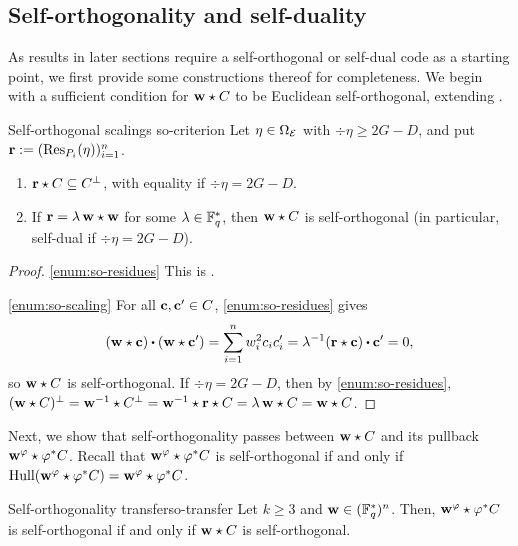 \documentclass[twocolumn, 11pt]{scrartcl}
\begin{document}
\subsection{Self-orthogonality and self-duality} \label{subsection:self-dual}

As results in later sections require a self-orthogonal or self-dual code as a starting point, we first provide some constructions thereof for completeness. We begin with a sufficient condition for $\mathbf{w}\star C$ to be Euclidean self-orthogonal, extending \cite[Lem.~3--4]{wang2026generic}.

\begin{lemma}{Self-orthogonal scalings \cite{wang2026generic}}{so-criterion}
    Let $\eta\in\Omega_\mathcal{E}$ with $\div\eta\geq2G-D$, and put $\mathbf{r}:=(\operatorname{Res}_{P_i}(\eta))_{i=1}^n$.
    \begin{enumerate}
        \item \label{enum:so-residues} $\mathbf{r}\star C\subseteq C^\perp$, with equality if $\div\eta=2G-D$.
        \item \label{enum:so-scaling} If $\mathbf{r}=\lambda\,\mathbf{w}\star\mathbf{w}$ for some $\lambda\in\mathbb{F}_q^*$, then $\mathbf{w}\star C$ is self-orthogonal (in particular, self-dual if $\div\eta=2G-D$).
    \end{enumerate}
\end{lemma}

\begin{proof}
    \ref{enum:so-residues} This is \cite[Lem.~3--4]{wang2026generic}.

    \ref{enum:so-scaling} For all $\mathbf{c},\mathbf{c}'\in C$, \ref{enum:so-residues} gives
    \[ (\bfw\star\bfc)\dotpr(\bfw\star\bfc')=\sum_{i=1}^nw_i^2c_ic'_i=\lambda^{-1}(\bfr\star\bfc)\dotpr\bfc'=0, \]
    so $\mathbf{w}\star C$ is self-orthogonal. If $\div\eta=2G-D$, then by \ref{enum:so-residues}, $(\mathbf{w}\star C)^\perp=\mathbf{w}^{-1}\star C^\perp=\mathbf{w}^{-1}\star\mathbf{r}\star C=\lambda\,\mathbf{w}\star C=\mathbf{w}\star C$.
\end{proof}

Next, we show that self-orthogonality passes between $\mathbf{w}\star C$ and its pullback $\mathbf{w}^\varphi\star\varphi^*C$. Recall that $\mathbf{w}^\varphi\star\varphi^*C$ is self-orthogonal if and only if $\operatorname{Hull}(\mathbf{w}^\varphi\star\varphi^*C)=\mathbf{w}^\varphi\star\varphi^*C$.

\begin{theorem}{Self-orthogonality transfer}{so-transfer}
    Let $k\geq3$ and $\mathbf{w}\in(\mathbb{F}_q^*)^n$. Then, $\mathbf{w}^\varphi\star \varphi^*C$ is self-orthogonal if and only if $\mathbf{w}\star C$ is self-orthogonal.
\end{theorem}
\end{document}
